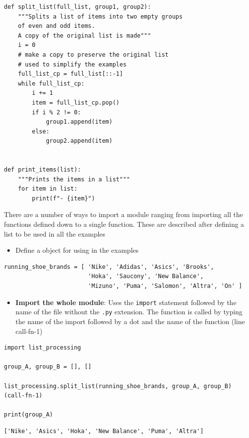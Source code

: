 \documentclass[10pt]{book}
\begin{document}
\label{orgcb38fc6}
\begin{verbatim}
def split_list(full_list, group1, group2):
    """Splits a list of items into two empty groups
    of even and odd items.
    A copy of the original list is made"""
    i = 0
    # make a copy to preserve the original list
    # used to simplify the examples
    full_list_cp = full_list[::-1]
    while full_list_cp:
        i += 1
        item = full_list_cp.pop()
        if i % 2 != 0:
            group1.append(item)
        else:
            group2.append(item)


def print_items(list):
    """Prints the items in a list"""
    for item in list:
        print(f"- {item}")
\end{verbatim}

There are a number of ways to import a module ranging from importing all the functions defined down to a single function. These are described after defining a list to be used in all the examples

\begin{itemize}
\item Define a object for using in the examples
\end{itemize}
\label{org9f0e668}
\begin{verbatim}
running_shoe_brands = [ 'Nike', 'Adidas', 'Asics', 'Brooks',
                        'Hoka', 'Saucony', 'New Balance',
                        'Mizuno', 'Puma', 'Salomon', 'Altra', 'On' ]
\end{verbatim}

\begin{itemize}
\item \textbf{Import the whole module}:  Uses the \texttt{import} statement followed by the name of the file without the \texttt{.py} extension. The function is called by typing the name of the import followed by a dot and the name of the function (line call-fn-1)
\end{itemize}
\label{org5fb396b}
\begin{verbatim}
import list_processing

group_A, group_B = [], []

list_processing.split_list(running_shoe_brands, group_A, group_B)      (call-fn-1)

print(group_A)
\end{verbatim}

\label{org27f5d35}
\begin{verbatim}
['Nike', 'Asics', 'Hoka', 'New Balance', 'Puma', 'Altra']
\end{verbatim}
\end{document}
